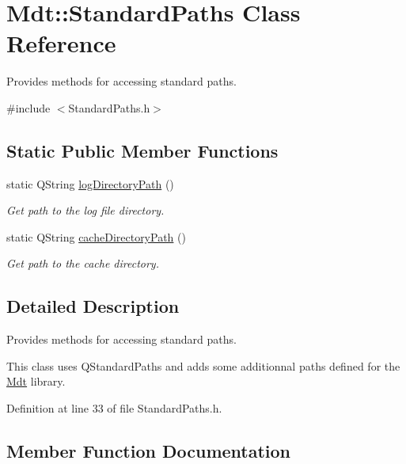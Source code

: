\hypertarget{class_mdt_1_1_standard_paths}{}\section{Mdt\+:\+:Standard\+Paths Class Reference}
\label{class_mdt_1_1_standard_paths}


Provides methods for accessing standard paths.  




{\ttfamily \#include $<$Standard\+Paths.\+h$>$}

\subsection*{Static Public Member Functions}
\begin{DoxyCompactItemize}
\item 
static Q\+String \hyperlink{class_mdt_1_1_standard_paths_aa45caeb4d2b4a5c539d301d800a7deac}{log\+Directory\+Path} ()
\begin{DoxyCompactList}\small\item\em Get path to the log file directory. \end{DoxyCompactList}\item 
static Q\+String \hyperlink{class_mdt_1_1_standard_paths_a2ca803e5a6b9fb2a4808968becfb86de}{cache\+Directory\+Path} ()
\begin{DoxyCompactList}\small\item\em Get path to the cache directory. \end{DoxyCompactList}\end{DoxyCompactItemize}


\subsection{Detailed Description}
Provides methods for accessing standard paths. 

This class uses Q\+Standard\+Paths and adds some additionnal paths defined for the \hyperlink{namespace_mdt}{Mdt} library. 

Definition at line 33 of file Standard\+Paths.\+h.



\subsection{Member Function Documentation}
